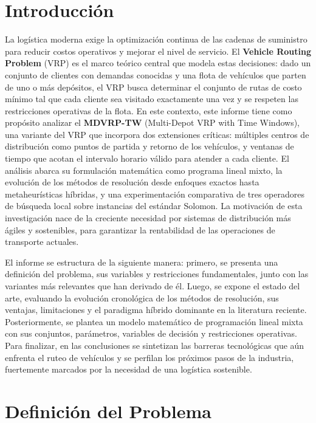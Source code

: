 \documentclass[letter, 10pt]{article}
\begin{document}
\section{Introducci\'on}

La log\'istica moderna exige la optimizaci\'on continua de las cadenas de suministro para reducir costos operativos y mejorar el nivel de servicio. El \textbf{Vehicle Routing Problem} (VRP) es el marco te\'orico central que modela estas decisiones: dado un conjunto de clientes con demandas conocidas y una flota de veh\'iculos que parten de uno o m\'as dep\'ositos, el VRP busca determinar el conjunto de rutas de costo m\'inimo tal que cada cliente sea visitado exactamente una vez y se respeten las restricciones operativas de la flota. En este contexto, este informe tiene como prop\'osito analizar el \textbf{MDVRP-TW} (Multi-Depot VRP with Time Windows), una variante del VRP que incorpora dos extensiones cr\'iticas: m\'ultiples centros de distribuci\'on como puntos de partida y retorno de los veh\'iculos, y ventanas de tiempo que acotan el intervalo horario v\'alido para atender a cada cliente. El an\'alisis abarca su formulaci\'on matem\'atica como programa lineal mixto, la evoluci\'on de los m\'etodos de resoluci\'on desde enfoques exactos hasta metaheur\'isticas h\'ibridas, y una experimentaci\'on comparativa de tres operadores de b\'usqueda local sobre instancias del est\'andar Solomon. La motivaci\'on de esta investigaci\'on nace de la creciente necesidad por sistemas de distribuci\'on m\'as \'agiles y sostenibles, para garantizar la rentabilidad de las operaciones de transporte actuales.

El informe se estructura de la siguiente manera: primero, se presenta una definici\'on del problema, sus variables y restricciones fundamentales, junto con las variantes m\'as relevantes que han derivado de \'el. Luego, se expone el estado del arte, evaluando la evoluci\'on cronol\'ogica de los m\'etodos de resoluci\'on, sus ventajas, limitaciones y el paradigma h\'ibrido dominante en la literatura reciente. Posteriormente, se plantea un modelo matem\'atico de programaci\'on lineal mixta con sus conjuntos, par\'ametros, variables de decisi\'on y restricciones operativas. Para finalizar, en las conclusiones se sintetizan las barreras tecnol\'ogicas que a\'un enfrenta el ruteo de veh\'iculos y se perfilan los pr\'oximos pasos de la industria, fuertemente marcados por la necesidad de una log\'istica sostenible.

\section{Definici\'on del Problema}
\end{document}
